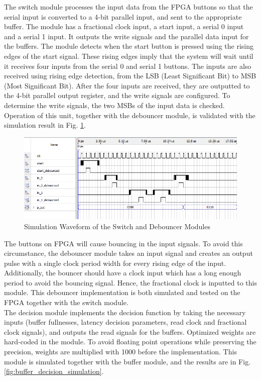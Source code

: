 \documentclass[journal,twoside]{IEEEtran}
\begin{document}
\indent The switch module processes the input data from the FPGA buttons so that the serial input is converted to a 4-bit parallel input, and sent to the appropriate buffer. The module has a fractional clock input, a start input, a serial 0 input and a serial 1 input. It outputs the write signals and the parallel data input for the buffers. The module detects when the start button is pressed using the rising edges of the start signal. These rising edges imply that the system will wait until it receives four inputs from the serial 0 and serial 1 buttons. The inputs are also received using rising edge detection, from the LSB (Least Significant Bit) to MSB (Most Significant Bit). After the four inputs are received, they are outputted to the 4-bit parallel output register, and the write signals are configured. To determine the write signals, the two MSBs of the input data is checked. Operation of this unit, together with the debouncer module, is validated with the simulation result in Fig. \ref{fig:switch_simulation}.

\begin{figure}[ht]
    \centering
    \includegraphics[width=0.95\linewidth]{figures/button_test.png}
    \captionsetup{justification=centering}
    \caption{Simulation Waveform of the Switch and Debouncer Modules}
    \label{fig:switch_simulation}
\end{figure}

The buttons on FPGA will cause bouncing in the input signals. To avoid this circumstance, the debouncer module takes an input signal and creates an output pulse with a single clock period width for every rising edge of the input. Additionally, the bouncer should have a clock input which has a long enough period to avoid the bouncing signal. Hence, the fractional clock is inputted to this module. This debouncer implementation is both simulated and tested on the FPGA together with the switch module.\\

\indent The decision module implements the decision function by taking the necessary inputs (buffer fullnesses, latency decision parameters, read clock and fractional clock signals), and outputs the read signals for the buffers. Optimized weights are hard-coded in the module. To avoid floating point operations while preserving the precision, weights are multiplied with 1000 before the implementation. This module is simulated together with the buffer module, and the results are in Fig. \ref{fig:buffer_decision_simulation}.
\end{document}
